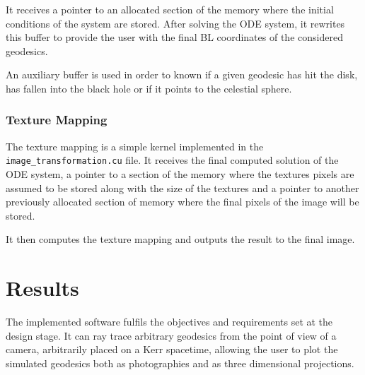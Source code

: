 It receives a pointer to an allocated section of the memory where the initial conditions of the system are stored. After solving the \ac{ODE} system, it rewrites this buffer to provide the user with the final \ac{BL} coordinates of the considered geodesics.

An auxiliary buffer is used in order to known if a given geodesic has hit the disk, has fallen into the black hole or if it points to the celestial sphere.

\subsubsection*{Texture Mapping}

The texture mapping is a simple kernel implemented in the \lstinline{image_transformation.cu} file. It receives the final computed solution of the \ac{ODE} system, a pointer to a section of the memory where the textures pixels are assumed to be stored along with the size of the textures and a pointer to another previously allocated section of memory where the final pixels of the image will be stored.

It then computes the texture mapping and outputs the result to the final image.




















\section{Results}
\label{chapter:results}

The implemented software fulfils the objectives and requirements set at the design stage. It can ray trace arbitrary geodesics from the point of view of a camera, arbitrarily placed on a Kerr spacetime, allowing the user to plot the simulated geodesics both as photographies and as three dimensional projections.

